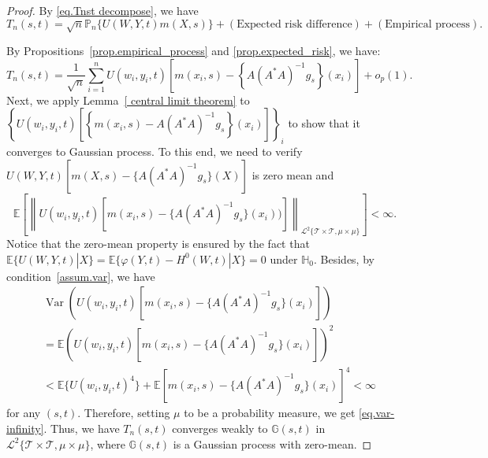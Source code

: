 \documentclass[
  12pt]{article}
\def\cL{\mathcal{L}}
\def\cT{\mathcal{T}}
\begin{document}
\nullhypothesis*
\begin{proof}
  By \eqref{eq.Tnst decompose}, we have
$$
T_n(s,t) =\sqrt{n}\mathbb{P}_n\{ U(W,Y,t) m(X,s) \}+\left( \text{Expected risk difference} \right) +\left( \text{Empirical process} \right).
$$

By Propositions~\ref{prop.empirical_process} and \ref{prop.expected_risk}, we have:
$$
T_n(s,t) =\frac{1}{\sqrt{n}}\sum_{i=1}^n{U(w_i,y_i,t)\left[m(x_i,s)- \left\{A(A^*A)^{-1}g_s\right\}(x_i)\right]}+o_{p}(1).
$$
Next, we apply Lemma~\ref{ central limit theorem} to $\left\{ U(w_i,y_i,t)\left[ \left\{m(x_i,s)-A(A^*A)^{-1}g_s\right\}(x_i)\right] \right\}_i$ to show that it converges to Gaussian process.  To this end, we need to verify $U(W,Y,t)[ m(X,s)-\{A(A^*A)^{-1}g_s\}(X)]$ is zero mean and 
\begin{equation}
\label{eq.var-infinity}
    \mathbb{E} \left[ \left\| U(w_i,y_i,t)[m(x_i,s)-\{A(A^*A)^{-1}g_s\}(x_i))] \right\|_{\cL^2\{\cT \times \cT, \mu \times \mu\}} \right] <\infty. 
\end{equation}
Notice that the zero-mean property is ensured by the fact that $\mathbb{E} \{ U(W,Y,t) |X \} =\mathbb{E} \{ \varphi(Y,t) -H^0(W,t) |X \} =0$ under $\mathbb H_0$. Besides, by condition~\ref{assum.var}, we have 
\begin{align*}
    & \operatorname{Var}(U(w_i,y_i,t)[ m(x_i,s)-\{A(A^*A)^{-1}g_s\}(x_i)] ) \\
    & =\mathbb{E}(U(w_i,y_i,t)[ m(x_i,s)-\{A(A^*A)^{-1}g_s\}(x_i)])^2 \\
    & <\mathbb{E}\{U(w_i,y_i,t)^4\}+\mathbb{E}[ m(x_i,s)-\{A(A^*A)^{-1}g_s\}(x_i)]^4<\infty
\end{align*} 
for any $(s,t)$. Therefore, setting $\mu$ to be a probability measure, we get \eqref{eq.var-infinity}. Thus, we have $T_n(s,t)$ converges weakly to $\mathbb{G}(s,t)$ in $\cL^2\{\cT \times \cT, \mu \times \mu\}$, where $\mathbb{G}(s,t)$ is a Gaussian process with zero-mean.


\end{proof}
\end{document}

